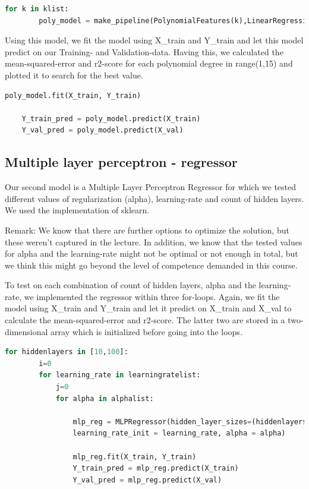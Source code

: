 \documentclass[12pt,a4paper]{scrartcl}		%
\begin{document}
\begin{lstlisting}[language=Python]
    for k in klist:
        poly_model = make_pipeline(PolynomialFeatures(k),LinearRegression())
\end{lstlisting}

Using this model, we fit the model using X\_train and Y\_train and let this model predict on our Training- and Validation-data. 
Having this, we calculated the mean-squared-error and r2-score for each polynomial degree in range(1,15) and plotted it to 
search for the best value. 

\begin{lstlisting}[language=Python]
    poly_model.fit(X_train, Y_train)

    Y_train_pred = poly_model.predict(X_train)
    Y_val_pred = poly_model.predict(X_val)
\end{lstlisting}

\subsection{Multiple layer perceptron - regressor}
Our second model is a Multiple Layer Perceptron Regressor for which we tested different values of regularization (alpha), 
learning-rate and count of hidden layers. We used the implementation of sklearn.

Remark: We know that there are further options to optimize the solution, but these weren’t captured in the lecture. 
In addition, we know that the tested values for alpha and the learning-rate might not be optimal or not enough in total, 
but we think this might go beyond the level of competence demanded in this course. 

To test on each combination of 	count of hidden layers, alpha and the learning-rate, we implemented the regressor within 
three for-loops. Again, we fit the model using X\_train and Y\_train and let it predict on X\_train and X\_val to calculate 
the mean-squared-error and r2-score. The latter two are stored in a two-dimensional array which is initialized before 
going into the loops. 

\begin{lstlisting}[language=Python]
    for hiddenlayers in [10,100]:
        i=0
        for learning_rate in learningratelist:
            j=0
            for alpha in alphalist:

                mlp_reg = MLPRegressor(hidden_layer_sizes=(hiddenlayers,), learning_rate ="constant",
                learning_rate_init = learning_rate, alpha = alpha)

                mlp_reg.fit(X_train, Y_train)
                Y_train_pred = mlp_reg.predict(X_train)
                Y_val_pred = mlp_reg.predict(X_val)
\end{lstlisting}
\end{document}
